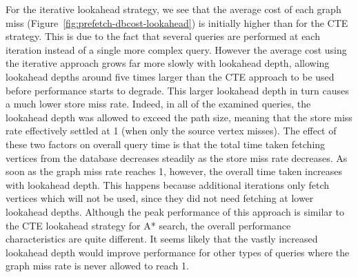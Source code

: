 For the iterative lookahead strategy, we see that the average cost of each
graph miss (Figure~\ref{fig:prefetch-dbcost-lookahead}) is initially higher
than for the CTE strategy. This is due to the fact that several queries are
performed at each iteration instead of a single more complex query. However the
average cost using the iterative approach grows far more slowly with lookahead
depth, allowing lookahead depths around five times larger than the CTE
approach to be used before performance starts to degrade. This larger
lookahead depth in turn causes a much lower store miss rate. Indeed, in all of
the examined queries, the lookahead depth was allowed to exceed the path size,
meaning that the store miss rate effectively settled at 1 (when only the
source vertex misses). The effect of these two factors on overall query
time is that the total time taken fetching vertices from the database
decreases steadily as the store miss rate decreases. As soon as the graph miss
rate reaches 1, however, the overall time taken increases with lookahead
depth. This happens because additional iterations only fetch vertices which will not be used, 
since they did not need fetching at lower lookahead depths. Although the peak performance of this approach is
similar to the CTE lookahead strategy for A* search, the overall performance
characteristics are quite different. It seems likely that the vastly increased
lookahead depth would improve performance for other types of queries where the graph miss
rate is never allowed to reach 1.

